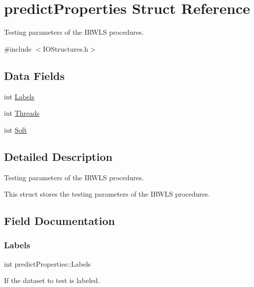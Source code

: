 \hypertarget{structpredictProperties}{}\section{predict\+Properties Struct Reference}
\label{structpredictProperties}


Testing parameters of the I\+R\+W\+LS procedures.  




{\ttfamily \#include $<$I\+O\+Structures.\+h$>$}

\subsection*{Data Fields}
\begin{DoxyCompactItemize}
\item 
int \hyperlink{structpredictProperties_a580276e3e15305d5ac16d9ce0eb9b20a}{Labels}
\item 
int \hyperlink{structpredictProperties_a602116e0d46424243cb4c971c03695e1}{Threads}
\item 
int \hyperlink{structpredictProperties_a3af58f4dd3147f2896e024e89307f7ac}{Soft}
\end{DoxyCompactItemize}


\subsection{Detailed Description}
Testing parameters of the I\+R\+W\+LS procedures. 

This struct stores the testing parameters of the I\+R\+W\+LS procedures. 

\subsection{Field Documentation}
\hypertarget{structpredictProperties_a580276e3e15305d5ac16d9ce0eb9b20a}{}\label{structpredictProperties_a580276e3e15305d5ac16d9ce0eb9b20a} 
\subsubsection{\texorpdfstring{Labels}{Labels}}
{\ttfamily int predict\+Properties\+::\+Labels}

If the dataset to test is labeled. \hypertarget{structpredictProperties_a3af58f4dd3147f2896e024e89307f7ac}{}\label{structpredictProperties_a3af58f4dd3147f2896e024e89307f7ac} 
